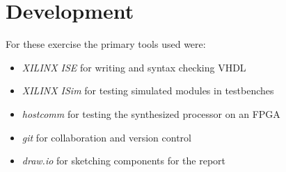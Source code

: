 \section{Development}
For these exercise the primary tools used were:
\begin{itemize}
    \item   \textit{XILINX ISE} for writing and syntax checking VHDL
    \item   \textit{XILINX ISim} for testing simulated modules in testbenches
    \item   \textit{hostcomm}\cite{bib:hostcomm} for testing the synthesized processor on an FPGA
    \item   \textit{git} for collaboration and version control
    \item   \textit{draw.io} for sketching components for the report
\end{itemize}

